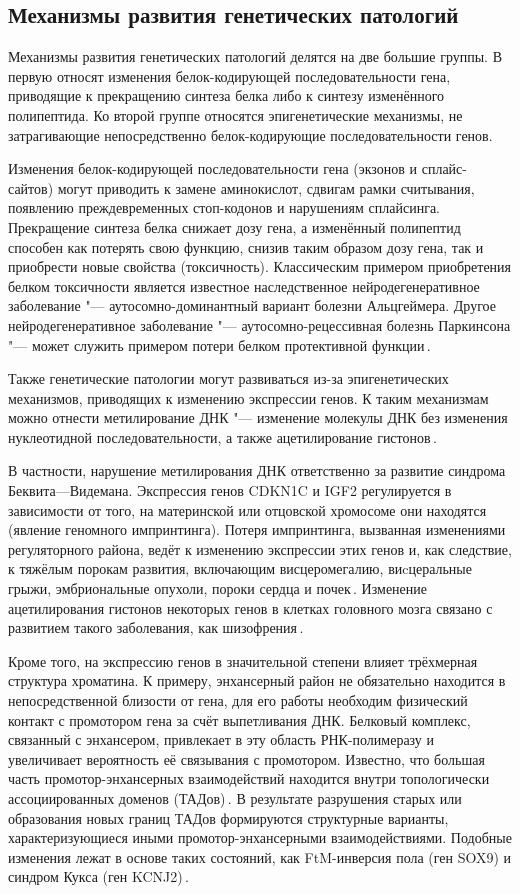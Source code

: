 \documentclass[a4paper,14pt]{extarticle}
\begin{document}
\subsection{Механизмы развития генетических патологий}

Механизмы развития генетических патологий делятся на две большие группы.
В первую относят изменения белок-кодирующей последовательности гена, приводящие к прекращению синтеза белка либо к синтезу изменённого полипептида.
Ко второй группе относятся эпигенетические механизмы, не затрагивающие непосредственно белок-кодирующие последовательности генов.

Изменения белок-кодирующей последовательности гена (экзонов и сплайс-сайтов) могут приводить к замене аминокислот, сдвигам рамки считывания, появлению преждевременных стоп-кодонов и нарушениям сплайсинга.
Прекращение синтеза белка снижает дозу гена, а изменённый полипептид способен как потерять свою функцию, снизив таким образом дозу гена, так и приобрести новые свойства (токсичность).
Классическим примером приобретения белком токсичности является известное наследственное нейродегенеративное заболевание "--- аутосомно-доминантный вариант болезни Альцгеймера.
Другое нейродегенеративное заболевание "--- аутосомно-рецессивная болезнь Паркинсона "--- может служить примером потери белком протективной функции\,\cite{Winklhofer_2008}.

Также генетические патологии могут развиваться из-за эпигенетических механизмов, приводящих к изменению экспрессии генов.
К таким механизмам можно отнести метилирование ДНК "--- изменение молекулы ДНК без изменения нуклеотидной последовательности, а также ацетилирование гистонов\,\cite{Handy_2011}.

В частности, нарушение метилирования ДНК ответственно за развитие синдрома Беквита---Видемана.
Экспрессия генов CDKN1C и IGF2 регулируется в зависимости от того, на материнской или отцовской хромосоме они находятся (явление геномного импринтинга).
Потеря импринтинга, вызванная изменениями регуляторного района, ведёт к изменению экспрессии этих генов и, как следствие, к тяжёлым порокам развития, включающим висцеромегалию, виcцеральные грыжи, эмбриональные опухоли, пороки сердца и почек\,\cite{Jin_2018}.
Изменение ацетилирования гистонов некоторых генов в клетках головного мозга связано с развитием такого заболевания, как шизофрения\,\cite{Tang_2011}.

Кроме того, на экспрессию генов в значительной степени влияет трёхмерная структура хроматина.
К примеру, энхансерный район не обязательно находится в непосредственной близости от гена, для его работы необходим физический контакт с промотором гена за счёт выпетливания ДНК.
Белковый комплекс, связанный с энхансером, привлекает в эту область РНК-полимеразу и увеличивает вероятность её связывания с промотором.
Известно, что большая часть промотор-энхансерных взаимодействий находится внутри топологически ассоциированных доменов (ТАДов)\,\cite{Rao_2014}.
В результате разрушения старых или образования новых границ ТАДов формируются структурные варианты, характеризующиеся иными промотор-энхансерными взаимодействиями.
Подобные изменения лежат в основе таких состояний, как FtM-инверсия пола (ген SOX9) и синдром Кукса (ген KCNJ2)\,\cite{Spielmann_2018}.
\end{document}
